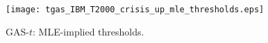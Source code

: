 \documentclass[a4paper,10pt]{article} %
\begin{document}
\begin{itemize}
\begin{itemize}
\begin{figure}[h]
\centering
\centering
\texttt{[image: tgas\_IBM\_T2000\_crisis\_up\_mle\_thresholds.eps]} 
\caption{GAS-$t$: MLE-implied thresholds.}
\label{fig:tgas_thres}       
\end{figure}

\end{itemize} 

\end{itemize} 


\end{document}

